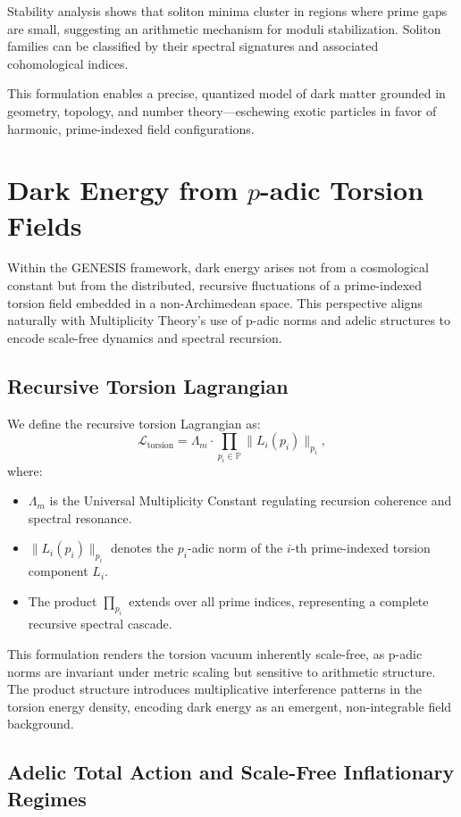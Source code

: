 \documentclass{article}
\theoremstyle{plain}
\begin{document}
Stability analysis shows that soliton minima cluster in regions where prime gaps are small, suggesting an arithmetic mechanism for moduli stabilization. Soliton families can be classified by their spectral signatures and associated cohomological indices.

This formulation enables a precise, quantized model of dark matter grounded in geometry, topology, and number theory—eschewing exotic particles in favor of harmonic, prime-indexed field configurations.

\section{Dark Energy from \texorpdfstring{$p$}{p}-adic Torsion Fields}

Within the GENESIS framework, dark energy arises not from a cosmological constant but from the distributed, recursive fluctuations of a prime-indexed torsion field embedded in a non-Archimedean space. This perspective aligns naturally with Multiplicity Theory’s use of p-adic norms and adelic structures to encode scale-free dynamics and spectral recursion.

\subsection{Recursive Torsion Lagrangian}

We define the recursive torsion Lagrangian as:
\[
\mathcal{L}_{\text{torsion}} = \Lambda_m \cdot \prod_{p_i \in \mathbb{P}} \|L_i(p_i)\|_{p_i},
\]
where:
\begin{itemize}
    \item $\Lambda_m$ is the Universal Multiplicity Constant regulating recursion coherence and spectral resonance.
    \item $\|L_i(p_i)\|_{p_i}$ denotes the $p_i$-adic norm of the $i$-th prime-indexed torsion component $L_i$.
    \item The product $\prod_{p_i}$ extends over all prime indices, representing a complete recursive spectral cascade.
\end{itemize}

This formulation renders the torsion vacuum inherently scale-free, as p-adic norms are invariant under metric scaling but sensitive to arithmetic structure. The product structure introduces multiplicative interference patterns in the torsion energy density, encoding dark energy as an emergent, non-integrable field background.

\subsection{Adelic Total Action and Scale-Free Inflationary Regimes}
\end{document}
